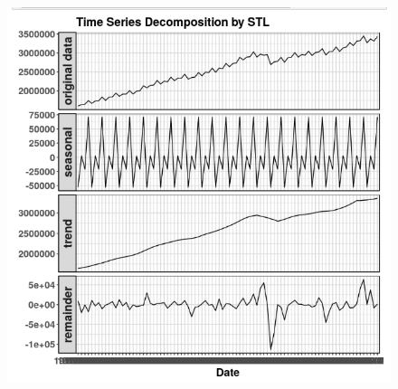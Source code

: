 \documentclass[c, dvipsnames]{beamer}  %
\begin{document}
\begin{frame}[shrink=5]
\frametitle{\insertsection} 
\framesubtitle{\insertsubsection}

\begin{figure}
	\centering
	\includegraphics[width=0.7\linewidth]{screenshot024}
	\label{fig:screenshot024}
\end{figure}



\end{frame}
\end{document}
